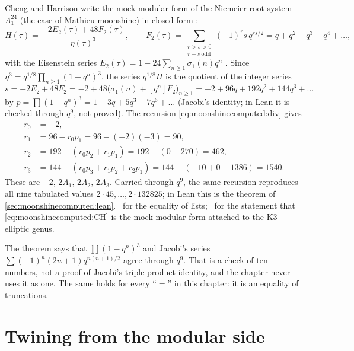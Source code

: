 Cheng and Harrison write the mock modular form of the Niemeier root system $A_1^{24}$
(the case of Mathieu moonshine) in closed form :
\begin{equation}\label{eq:moonshinecomputed:CH}
  H(\tau)=\frac{-2E_2(\tau)+48F_2(\tau)}{\eta(\tau)^3},\qquad
  F_2(\tau)=\sum_{\substack{r>s>0\\ r-s\ \mathrm{odd}}}(-1)^r s\,q^{rs/2}
  =q+q^2-q^3+q^4+\dots,
\end{equation}
with the Eisenstein series $E_2(\tau)=1-24\sum_{n\ge1}\sigma_1(n)q^n$ . Since
$\eta^3=q^{1/8}\prod_{n\ge1}(1-q^n)^3$, the series $q^{1/8}H$ is the quotient of the
integer series
\begin{equation}
  s=-2E_2+48F_2=-2+48\bigl(\sigma_1(n)+[q^n]F_2\bigr)_{n\ge1}
  =-2+96q+192q^2+144q^3+\dots
\end{equation}
by $p=\prod(1-q^n)^3=1-3q+5q^3-7q^6+\dots$ (Jacobi's identity; in Lean it is checked
through $q^9$, not proved). The recursion \eqref{eq:moonshinecomputed:div} gives
\begin{align*}
  r_0&=-2,\\
  r_1&=96-r_0p_1=96-(-2)(-3)=90,\\
  r_2&=192-(r_0p_2+r_1p_1)=192-(0-270)=462,\\
  r_3&=144-(r_0p_3+r_1p_2+r_2p_1)=144-(-10+0-1386)=1540.
\end{align*}
These are $-2,\,2A_1,\,2A_2,\,2A_3$. Carried through $q^9$, the same recursion reproduces
all nine tabulated values $2\cdot45,\dots,2\cdot132825$; in Lean this is the theorem
 of \cref{sec:moonshinecomputed:lean}. \TA\ for the equality
of lists; \TL\ for the statement that \eqref{eq:moonshinecomputed:CH} is the mock modular
form attached to the K3 elliptic genus.

\begin{pitfallbox}
The theorem  says that $\prod(1-q^n)^3$ and Jacobi's series
$\sum(-1)^n(2n+1)q^{n(n+1)/2}$ agree through $q^9$. That is a check of ten numbers, not a
proof of Jacobi's triple product identity, and the chapter never uses it as one. The same
holds for every ``$=$'' in this chapter: it is an equality of truncations.
\end{pitfallbox}

\section{Twining from the modular side}\label{sec:moonshinecomputed:twining}

